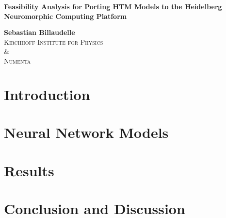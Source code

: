 \documentclass[twoside, letterpaper]{scrartcl}
\begin{document}
\setlength\abovedisplayskip{5pt}
\setlength\belowdisplayskip{20pt}
\setlength\abovedisplayshortskip{5pt}
\setlength\belowdisplayshortskip{20pt}


\begin{titlepage}
	\vspace{5cm}
	\begin{center}
		{\LARGE\bfseries Feasibility Analysis for Porting HTM Models to the Heidelberg Neuromorphic Computing Platform}
	\end{center}
	
	\vfill

	\begin{center}
		{\large\bfseries Sebastian Billaudelle}\\[0.8em]
		\textsc{Kirchhoff-Institute for Physics}\\
		\&\\
		\textsc{Numenta}
	\end{center}
\end{titlepage}

\restoregeometry

\cleardoublepage


\cleardoublepage

\tableofcontents
\cleardoublepage


\glsresetall

\section{Introduction}


\clearpage
\section{Neural Network Models}


\clearpage
\section{Results}


\clearpage
\section{Conclusion and Discussion}


\clearpage
\printbibliography
\end{document}

